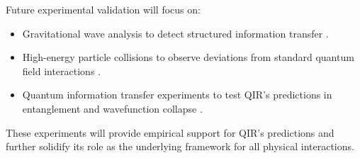 \documentclass{article}
\begin{document}
Future experimental validation will focus on:
\begin{itemize}
    \item Gravitational wave analysis to detect structured information transfer \cite{ligo}.
    \item High-energy particle collisions to observe deviations from standard quantum field interactions \cite{cernlhc}.
    \item Quantum information transfer experiments to test QIR’s predictions in entanglement and wavefunction collapse \cite{quantuminformation}.
\end{itemize}
These experiments will provide empirical support for QIR's predictions and further solidify its role as the underlying framework for all physical interactions.
\end{document}
